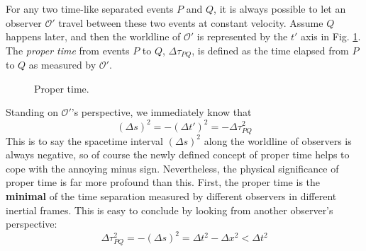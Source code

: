\documentclass[11pt]{article}
\begin{document}
For any two time-like separated events $P$ and $Q$, it is always possible to let an observer $\mathcal{O}'$ travel between these two events at constant velocity. Assume $Q$ happens later, and then the worldline of $\mathcal{O}'$ is represented by the $t'$ axis in Fig. \ref{fig_propertime}. The \textit{proper time} from events $P$ to $Q$, $\Delta\tau_{PQ}$, is defined as the time elapsed from $P$ to $Q$ as measured by $\mathcal{O}'$.
\begin{figure}[H]
    \centering
    \caption{Proper time.}
    \label{fig_propertime}
\end{figure}
Standing on $\mathcal{O}'$'s perspective, we immediately know that
\begin{equation}
    (\Delta s)^2=-(\Delta t')^2=-\Delta\tau_{PQ}^2
\end{equation}
This is to say the spacetime interval $(\Delta s)^2$ along the worldline of observers is always negative, so of course the newly defined concept of proper time helps to cope with the annoying minus sign. Nevertheless, the physical significance of proper time is far more profound than this. First, the proper time is the \textbf{minimal} of the time separation measured by different observers in different inertial frames. This is easy to conclude by looking from another observer's perspective:
\begin{equation}
    \Delta\tau_{PQ}^2=-(\Delta s)^2=\Delta t^2-\Delta x^2<\Delta t^2
\end{equation}
\end{document}
